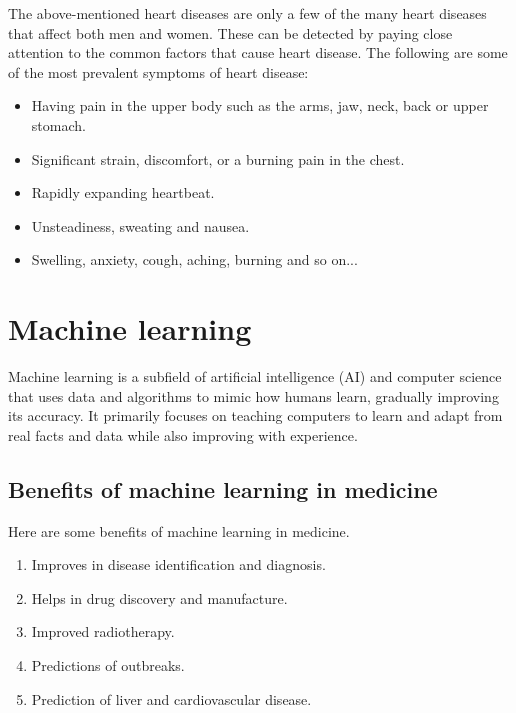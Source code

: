 The above-mentioned heart diseases are only a few of the many heart diseases that affect both men and women. These can be detected by paying close attention to the common factors that cause heart disease. The following are some of the most prevalent symptoms of heart disease:

\begin{itemize}
	\item{Having pain in the upper body such as the arms, jaw, neck, back or upper stomach.}
	\item{Significant strain, discomfort, or a burning pain in the chest.}
	\item{Rapidly expanding heartbeat.}
	\item{Unsteadiness, sweating and nausea.}
	\item{Swelling, anxiety, cough, aching, burning and so on...}
\end{itemize}

\section{Machine learning}
Machine learning is a subfield of artificial intelligence (AI) and computer science that uses data and algorithms to mimic how humans learn, gradually improving its accuracy. It primarily focuses on teaching computers to learn and adapt from real facts and data while also improving with experience.

\subsection{Benefits of machine learning in medicine}
Here are some benefits of machine learning in medicine.
\begin{enumerate}
	\item{Improves in disease identification and diagnosis.}
	
	\item{Helps in drug discovery and manufacture.}
	
	\item{Improved radiotherapy.}
	
	\item{Predictions of outbreaks.}
	
	\item {Prediction of liver and cardiovascular disease.}
\end{enumerate}

